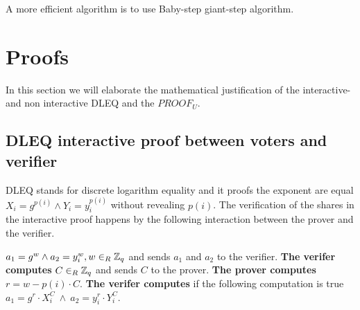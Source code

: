  A more efficient algorithm is to use Baby-step giant-step algorithm. 


\section{Proofs}
In this section we will elaborate the mathematical justification of the interactive- and non interactive DLEQ and the $PROOF_U$. 

\subsection{DLEQ interactive proof between voters and verifier}
DLEQ stands for discrete logarithm equality and it proofs the exponent are equal \begin{math}X_i=g^{p(i)}  \land Y_i=y_i^{p(i)} \end{math} without revealing \begin{math}{p(i)} \end{math}. The verification of the shares in the interactive proof happens by the following  interaction between the prover and the verifier.

  \begin{math}a_1=g^w  \land a_2=y_i^w,  w\in_R \mathbb{Z}_q \end{math} and sends $a_1$ and $a_2$ to the verifier. \textbf{ The verifer computes}  \begin{math}C\in_R \mathbb{Z}_q \end{math} and sends $C$ to the prover. \textbf{The prover computes}  \begin{math}r=w-p(i)  \cdot  C\end{math}. \textbf{The verifer computes}  if the following computation is true \begin{math}a_1 = g^r \cdot X_i^C \ \land \ a_2=y_i^r \cdot Y_i^C\end{math}.



